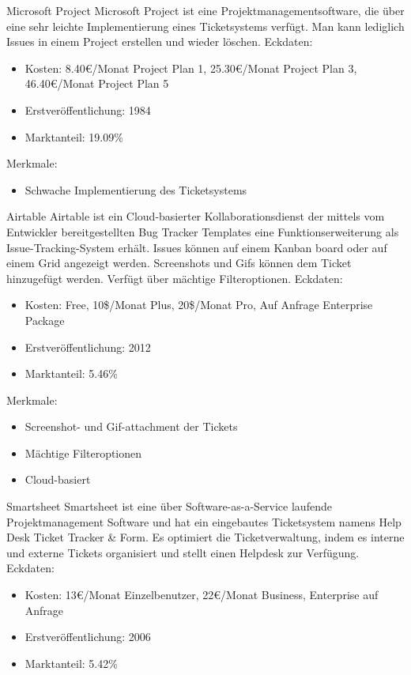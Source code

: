 Microsoft Project			
Microsoft Project ist eine Projektmanagementsoftware, die über eine sehr leichte Implementierung eines Ticketsystems verfügt. Man kann lediglich Issues in einem Project erstellen und wieder löschen.
Eckdaten:
\begin{itemize}
	\item Kosten: 8.40€/Monat Project Plan 1, 25.30€/Monat Project Plan 3, 46.40€/Monat Project Plan 5
	\item Erstveröffentlichung: 1984
	\item Marktanteil: 19.09\%
\end{itemize}
Merkmale:
\begin{itemize}
	\item Schwache Implementierung des Ticketsystems
\end{itemize}				
Airtable				
Airtable ist ein Cloud-basierter Kollaborationsdienst der mittels vom Entwickler bereitgestellten Bug Tracker Templates eine Funktionserweiterung als Issue-Tracking-System erhält. Issues können auf einem Kanban board oder auf einem Grid angezeigt werden. Screenshots und Gifs können dem Ticket hinzugefügt werden. Verfügt über mächtige Filteroptionen.	
Eckdaten:
\begin{itemize}
	\item Kosten: Free, 10\$/Monat Plus, 20\$/Monat Pro, Auf Anfrage Enterprise Package
	\item Erstveröffentlichung: 2012 
	\item Marktanteil: 5.46\%
\end{itemize}				
Merkmale:
\begin{itemize}
	\item Screenshot- und Gif-attachment der Tickets
	\item Mächtige Filteroptionen
	\item Cloud-basiert
\end{itemize}
Smartsheet				
Smartsheet ist eine über Software-as-a-Service laufende Projektmanagement Software und hat ein eingebautes Ticketsystem namens Help Desk Ticket Tracker \& Form. Es optimiert die Ticketverwaltung, indem es interne und externe Tickets organisiert und stellt einen Helpdesk zur Verfügung. 
Eckdaten:
\begin{itemize}
	\item Kosten: 13€/Monat Einzelbenutzer, 22€/Monat Business, Enterprise auf Anfrage
	\item Erstveröffentlichung: 2006
	\item Marktanteil: 5.42\%
\end{itemize}		
